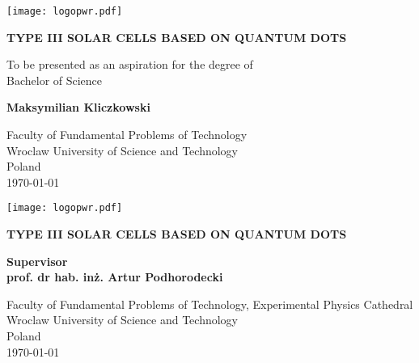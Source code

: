 \begin{titlepage}
   \begin{center}
       \vspace*{1cm}
       
	   \texttt{[image: logopwr.pdf]}
	   
	   \vspace*{5cm}
	   
       \textbf{\Huge TYPE III SOLAR CELLS \vspace{0.1cm} BASED ON QUANTUM DOTS}
       
       \vspace{1.5cm}
       
 	   \Large To be presented as an aspiration for the degree of \\ Bachelor of Science
 	   
       \vfill
       
	   \textbf{Maksymilian Kliczkowski}
       \vspace{0.8cm}
 
       
 
       \small Faculty of Fundamental Problems of Technology\\
       Wroclaw University of Science and Technology\\
       Poland\\
       \today
 
   \end{center}
\end{titlepage}

\newpage
\thispagestyle{plain}
 \begin{center}
       \vspace*{1cm}
       
	   \texttt{[image: logopwr.pdf]}
	   
	   \vspace*{5cm}
	   
       \textbf{\Huge TYPE III SOLAR CELLS \vspace{0.1cm} BASED ON QUANTUM DOTS}
       
       \vspace{1.5cm}
 	   
       
	   \Large \textbf{Supervisor\\ prof. dr hab. inż. Artur Podhorodecki}
       \vspace{1.8cm}
 
       
 
       \small Faculty of Fundamental Problems of Technology, Experimental Physics Cathedral\\
       Wroclaw University of Science and Technology\\
       Poland\\
       \today
 
   \end{center}